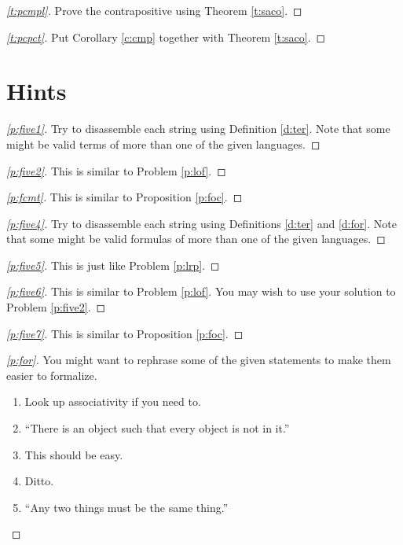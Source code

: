 \documentclass[12pt]{amsbook}
\theoremstyle{plain}
\theoremstyle{definition}
\theoremstyle{remark}
\newenvironment{clue}[1]%
{\begin{proof}[\ref{#1}]}%
{\renewcommand{\qed}{}\end{proof}}
\begin{document}
\begin{clue}{t:pcmpl}
Prove the contrapositive using Theorem \ref{t:saco}.
\end{clue}

\begin{clue}{t:pcpct}
Put Corollary \ref{c:cmp} together with Theorem \ref{t:saco}.
\end{clue}



%
%

\chapter{Hints}


\begin{clue}{p:five1}
Try to disassemble each string using Definition \ref{d:ter}.  Note that some might be valid terms of more than one of the given languages.
\end{clue}

\begin{clue}{p:five2}
This is similar to Problem \ref{p:lof}.
\end{clue}

\begin{clue}{p:fcmt}
This is similar to Proposition \ref{p:foc}.
\end{clue}

\begin{clue}{p:five4}
Try to disassemble each string using Definitions \ref{d:ter} and \ref{d:for}.  Note that some might be valid formulas of more than one of the given languages.
\end{clue}

\begin{clue}{p:five5}
This is just like Problem \ref{p:lrp}.
\end{clue}

\begin{clue}{p:five6}
This is similar to Problem \ref{p:lof}.  You may wish to use your solution to Problem \ref{p:five2}.
\end{clue}

\begin{clue}{p:five7}
This is similar to Proposition \ref{p:foc}.
\end{clue}

\begin{clue}{p:for}
You might want to rephrase some of the given statements to make them easier to formalize.
\begin{enumerate}
\item Look up associativity if you need to.
\item``There is an object such that every object is not in it.''
\item This should be easy.
\item Ditto.
\item ``Any two things must be the same thing.''
\end{enumerate}
\end{clue}
\end{document}
